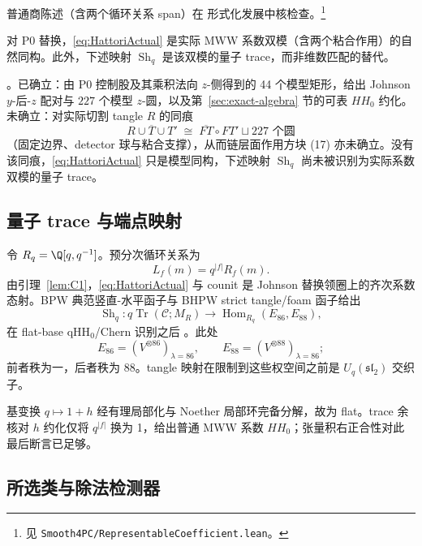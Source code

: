 普通商陈述（含两个循环关系 span）在
形式化发展中核检查。\footnote{见
\texttt{Smooth4PC/RepresentableCoefficient.lean}。}

\begin{lemma}[实际系数双模]\label{lem:C1}
对 P0 替换，\eqref{eq:HattoriActual} 是实际 MWW 系数双模（含两个粘合作用）的自然同构。此外，下述映射 \(\operatorname{Sh}_q\) 是该双模的量子 trace，而非维数匹配的替代。
\end{lemma}

\begin{remark}
\Open。已确立：由 P0 控制股及其乘积法向 $z$-侧得到的 44 个模型矩形，给出 Johnson $y$-后-$z$ 配对与 $227$ 个模型 $z$-圆，以及第~\ref{sec:exact-algebra} 节的可表 $HH_0$ 约化。未确立：对实际切割 tangle $R$ 的同痕
\[
R\cup\overline T\cup T'\;\cong\;\overline{FT}\circ FT'\sqcup 227\text{ 个圆}
\]
（固定边界、detector 球与粘合支撑），从而链层面作用方块 (17) 亦未确立。没有该同痕，\eqref{eq:HattoriActual} 只是模型同构，下述映射 $\operatorname{Sh}_q$ 尚未被识别为实际系数双模的量子 trace。
\end{remark}

\subsection{量子 trace 与端点映射}

令 $R_q=\Q[q,q^{-1}]$。预分次循环关系为
\[
L_f(m)=q^{|f|}R_f(m).
\]
由引理~\ref{lem:C1}，\eqref{eq:HattoriActual} 与 counit 是 Johnson 替换领圈上的齐次系数态射。BPW 典范竖直-水平函子与 BHPW strict tangle/foam 函子给出
\begin{equation}\label{eq:actualShadow}
\operatorname{Sh}_q:q\operatorname{Tr}(\mathcal C;M_R)
\longrightarrow\operatorname{Hom}_{R_q}(E_{86},E_{88}),
\end{equation}
在 flat-base qHH$_0$/Chern 识别之后
\cite{BeliakovaPutyraWehrli2019,BeliakovaHogancampPutyraWehrli2023}。此处
\[
E_{86}=(V^{\otimes86})_{\lambda=86},\qquad
E_{88}=(V^{\otimes88})_{\lambda=86};
\]
前者秩为一，后者秩为 88。tangle 映射在限制到这些权空间之前是 $U_q(\mathfrak{sl}_2)$ 交织子。

基变换 $q\mapsto1+h$ 经有理局部化与 Noether 局部环完备分解，故为 flat。trace 余核对 $h$ 约化仅将 $q^{|f|}$ 换为 1，给出普通 MWW 系数 $HH_0$；张量积右正合性对此最后断言已足够。

\subsection{所选类与除法检测器}

